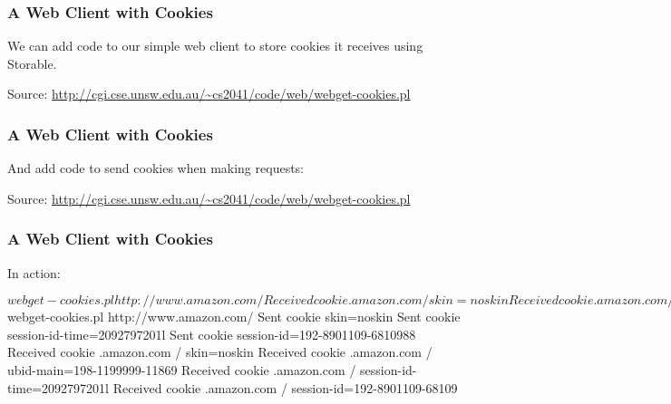 \begin{frame}[fragile]
\frametitle{A Web Client with Cookies}

We can  add code to our simple web client to store cookies it receives using Storable.


{\tiny Source:  \href{http://cgi.cse.unsw.edu.au/~cs2041/code/web/webget-cookies.pl}{http://cgi.cse.unsw.edu.au/{\textasciitilde}cs2041/code/web/webget-cookies.pl}}

\end{frame}

\begin{frame}[fragile]
\frametitle{A Web Client with Cookies}

And add code to send cookies when making requests:

\begin{small}
\end{small}

{\tiny Source:  \href{http://cgi.cse.unsw.edu.au/~cs2041/code/web/webget-cookies.pl}{http://cgi.cse.unsw.edu.au/{\textasciitilde}cs2041/code/web/webget-cookies.pl}}
\end{frame}

\begin{frame}[fragile]
\frametitle{A Web Client with Cookies}

In action:

\begin{small}
\begin{sh}
$ webget-cookies.pl http://www.amazon.com/
Received cookie .amazon.com / skin=noskin
Received cookie .amazon.com / session-id-time=2092797201l
Received cookie .amazon.com / session-id=192-8901109-68109
$ webget-cookies.pl http://www.amazon.com/
Sent cookie skin=noskin
Sent cookie session-id-time=2092797201l
Sent cookie session-id=192-8901109-6810988
Received cookie .amazon.com / skin=noskin
Received cookie .amazon.com / ubid-main=198-1199999-11869
Received cookie .amazon.com / session-id-time=2092797201l
Received cookie .amazon.com / session-id=192-8901109-68109
\end{sh}
\end{small}
\end{frame}

